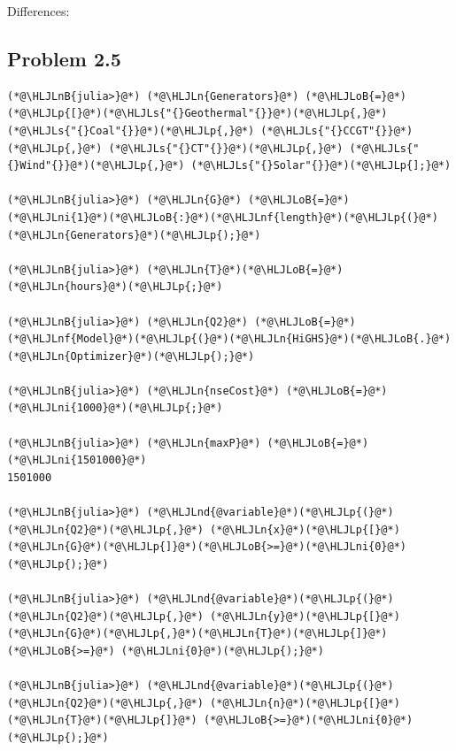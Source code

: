 \documentclass[12pt,a4paper]{article}
\newcommand{\HLJLn}[1]{#1}
\newcommand{\HLJLnd}[1]{\textcolor[RGB]{214,102,97}{#1}}
\newcommand{\HLJLnf}[1]{\textcolor[RGB]{66,102,213}{#1}}
\newcommand{\HLJLs}[1]{\textcolor[RGB]{201,61,57}{#1}}
\newcommand{\HLJLnB}[1]{\textcolor[RGB]{59,151,46}{#1}}
\newcommand{\HLJLni}[1]{\textcolor[RGB]{59,151,46}{#1}}
\newcommand{\HLJLoB}[1]{\textcolor[RGB]{102,102,102}{\textbf{#1}}}
\newcommand{\HLJLp}[1]{#1}
\begin{document}
Differences:

\subsection{Problem 2.5}

\begin{lstlisting}
(*@\HLJLnB{julia>}@*) (*@\HLJLn{Generators}@*) (*@\HLJLoB{=}@*) (*@\HLJLp{[}@*)(*@\HLJLs{"{}Geothermal"{}}@*)(*@\HLJLp{,}@*) (*@\HLJLs{"{}Coal"{}}@*)(*@\HLJLp{,}@*) (*@\HLJLs{"{}CCGT"{}}@*)(*@\HLJLp{,}@*) (*@\HLJLs{"{}CT"{}}@*)(*@\HLJLp{,}@*) (*@\HLJLs{"{}Wind"{}}@*)(*@\HLJLp{,}@*) (*@\HLJLs{"{}Solar"{}}@*)(*@\HLJLp{];}@*)

(*@\HLJLnB{julia>}@*) (*@\HLJLn{G}@*) (*@\HLJLoB{=}@*) (*@\HLJLni{1}@*)(*@\HLJLoB{:}@*)(*@\HLJLnf{length}@*)(*@\HLJLp{(}@*)(*@\HLJLn{Generators}@*)(*@\HLJLp{);}@*)

(*@\HLJLnB{julia>}@*) (*@\HLJLn{T}@*)(*@\HLJLoB{=}@*) (*@\HLJLn{hours}@*)(*@\HLJLp{;}@*)

(*@\HLJLnB{julia>}@*) (*@\HLJLn{Q2}@*) (*@\HLJLoB{=}@*) (*@\HLJLnf{Model}@*)(*@\HLJLp{(}@*)(*@\HLJLn{HiGHS}@*)(*@\HLJLoB{.}@*)(*@\HLJLn{Optimizer}@*)(*@\HLJLp{);}@*)

(*@\HLJLnB{julia>}@*) (*@\HLJLn{nseCost}@*) (*@\HLJLoB{=}@*) (*@\HLJLni{1000}@*)(*@\HLJLp{;}@*)

(*@\HLJLnB{julia>}@*) (*@\HLJLn{maxP}@*) (*@\HLJLoB{=}@*) (*@\HLJLni{1501000}@*)
1501000

(*@\HLJLnB{julia>}@*) (*@\HLJLnd{@variable}@*)(*@\HLJLp{(}@*)(*@\HLJLn{Q2}@*)(*@\HLJLp{,}@*) (*@\HLJLn{x}@*)(*@\HLJLp{[}@*)(*@\HLJLn{G}@*)(*@\HLJLp{]}@*)(*@\HLJLoB{>=}@*)(*@\HLJLni{0}@*)(*@\HLJLp{);}@*)

(*@\HLJLnB{julia>}@*) (*@\HLJLnd{@variable}@*)(*@\HLJLp{(}@*)(*@\HLJLn{Q2}@*)(*@\HLJLp{,}@*) (*@\HLJLn{y}@*)(*@\HLJLp{[}@*)(*@\HLJLn{G}@*)(*@\HLJLp{,}@*)(*@\HLJLn{T}@*)(*@\HLJLp{]}@*) (*@\HLJLoB{>=}@*) (*@\HLJLni{0}@*)(*@\HLJLp{);}@*)

(*@\HLJLnB{julia>}@*) (*@\HLJLnd{@variable}@*)(*@\HLJLp{(}@*)(*@\HLJLn{Q2}@*)(*@\HLJLp{,}@*) (*@\HLJLn{n}@*)(*@\HLJLp{[}@*)(*@\HLJLn{T}@*)(*@\HLJLp{]}@*) (*@\HLJLoB{>=}@*)(*@\HLJLni{0}@*)(*@\HLJLp{);}@*)


\end{lstlisting}
\end{document}
